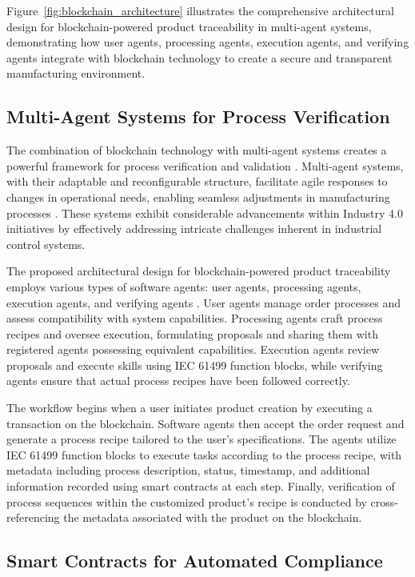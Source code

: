 Figure~\ref{fig:blockchain_architecture} illustrates the comprehensive architectural design for blockchain-powered product traceability in multi-agent systems, demonstrating how user agents, processing agents, execution agents, and verifying agents integrate with blockchain technology to create a secure and transparent manufacturing environment.

\subsection{Multi-Agent Systems for Process Verification}

The combination of blockchain technology with multi-agent systems creates a powerful framework for process verification and validation \cite{mas_i40}. Multi-agent systems, with their adaptable and reconfigurable structure, facilitate agile responses to changes in operational needs, enabling seamless adjustments in manufacturing processes \cite{NILSSON2023102450}. These systems exhibit considerable advancements within Industry 4.0 initiatives by effectively addressing intricate challenges inherent in industrial control systems.

The proposed architectural design for blockchain-powered product traceability employs various types of software agents: user agents, processing agents, execution agents, and verifying agents \cite{aljosha_cap_skill_plug_play}. User agents manage order processes and assess compatibility with system capabilities. Processing agents craft process recipes and oversee execution, formulating proposals and sharing them with registered agents possessing equivalent capabilities. Execution agents review proposals and execute skills using IEC 61499 function blocks, while verifying agents ensure that actual process recipes have been followed correctly.

The workflow begins when a user initiates product creation by executing a transaction on the blockchain. Software agents then accept the order request and generate a process recipe tailored to the user's specifications. The agents utilize IEC 61499 function blocks to execute tasks according to the process recipe, with metadata including process description, status, timestamp, and additional information recorded using smart contracts at each step. Finally, verification of process sequences within the customized product's recipe is conducted by cross-referencing the metadata associated with the product on the blockchain.

\subsection{Smart Contracts for Automated Compliance}

